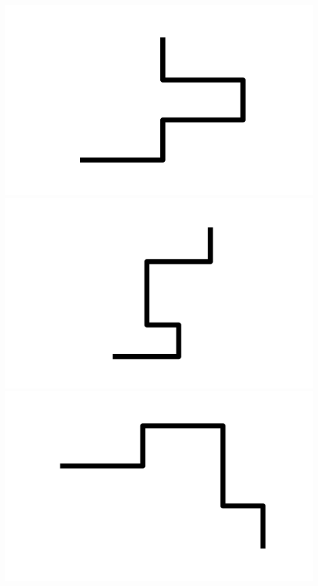 \documentclass[]{report}
\begin{document}
\includegraphics[scale=.1]{pictures/21/state_cluster_shapes_361.pdf} 
\includegraphics[scale=.1]{pictures/21/state_cluster_shapes_362.pdf} 
\includegraphics[scale=.1]{pictures/21/state_cluster_shapes_363.pdf} 
\end{document}
